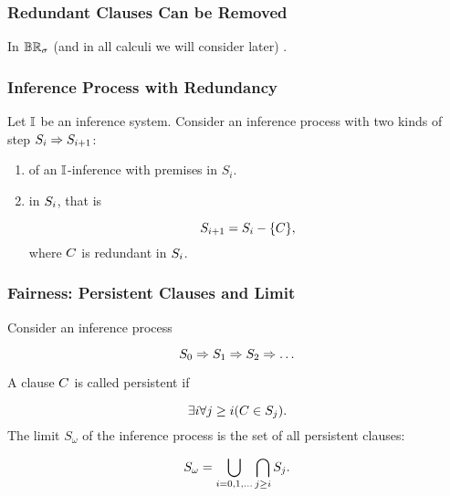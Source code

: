                 
\begin{frame}
  \frametitle{Redundant Clauses Can be Removed}


  In $\mathbb{BR}_{\sigma}$ (and in all calculi we will consider later) 
  .

\end{frame}


                \begin{frame}\frametitle{Inference Process with Redundancy}

Let ${\mathbb{I}}$ be an inference system. Consider an inference process with
two kinds of step ${S_i \Rightarrow S_{i+1}}$:

\begin{enumerate}
\item {} of an ${\mathbb{I}}$-inference with
  premises in $S_i$.

\item {} in ${S_i}$, that is 

  \[{S_{i+1} = S_i - {\{C\}}},\]
where ${C}$ is redundant in ${S_i}$.
\end{enumerate}

                                \end{frame}



                 \begin{frame}\frametitle{Fairness: Persistent Clauses and Limit}

Consider an inference process

\[{
  S_0 \Rightarrow S_1 \Rightarrow S_2 \Rightarrow \ldots
}\]

A clause ${C}$ is called \alert{persistent} if

\[{
    \exists i \forall j \geq i (C \in S_j).
}\]
The \alert{limit $S_{\omega}$} of the inference process is
the set of all persistent clauses:

\[{
  S_\omega = \bigcup_{i=0,1,\ldots}\bigcap_{j \geq i} S_j.
}\]

                                \end{frame}



